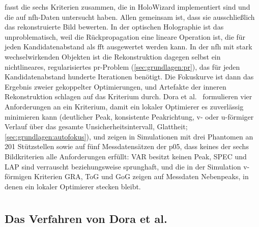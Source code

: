  fasst die sechs Kriterien zusammen, die in
HoloWizard implementiert sind und die \cite{dora2025autofocus} auf
\ac{nfh}-Daten untersucht haben. Allen gemeinsam ist, dass sie
ausschließlich das rekonstruierte Bild bewerten. In der optischen
Holographie ist das unproblematisch, weil die Rückpropagation eine lineare
Operation ist, die für jeden Kandidatenabstand als \ac{fft} ausgewertet
werden kann. In der \ac{nfh} mit stark wechselwirkenden Objekten ist die
Rekonstruktion dagegen selbst ein nichtlineares, regularisiertes
\ac{pr}-Problem (\cref{sec:grundlagen:pr}), das für jeden Kandidatenabstand
hunderte Iterationen benötigt. Die Fokuskurve ist dann das Ergebnis zweier
gekoppelter Optimierungen, und Artefakte der inneren Rekonstruktion
schlagen auf das Kriterium durch. Dora et al.\ \cite{dora2025autofocus}
formulieren vier
Anforderungen an ein Kriterium, damit ein lokaler Optimierer es zuverlässig
minimieren kann (deutlicher Peak, konsistente Peakrichtung, v- oder
u-förmiger Verlauf über das gesamte Unsicherheitsintervall, Glattheit;
\cref{sec:grundlagen:autofokus}), und zeigen in Simulationen mit drei
Phantomen an 201 Stützstellen sowie auf fünf Messdatensätzen der \ac{p05},
dass keines der sechs Bildkriterien alle Anforderungen erfüllt: VAR besitzt
keinen Peak, SPEC und LAP sind verrauscht beziehungsweise sprunghaft, und
die in der Simulation v-förmigen Kriterien GRA, ToG und GoG zeigen auf
Messdaten Nebenpeaks, in denen ein lokaler Optimierer stecken bleibt.

\section{}
\label{sec:stand:modellbasiert}

\subsection{Das Verfahren von Dora et al.}

